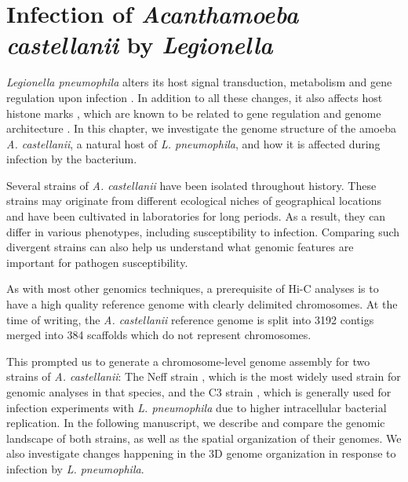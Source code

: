 
\chapter{Infection of \textit{Acanthamoeba castellanii} by \textit{Legionella}} %

\label{ch:02-02} %


\textit{Legionella pneumophila} alters its host signal transduction, metabolism and gene regulation upon infection \cite{escollTargetingHostOrganelles2016,escollLegionellaPneumophilaModulates2017}. In addition to all these changes, it also affects host histone marks \cite{rolandoLegionellaPneumophilaEffector2013}, which are known to be related to gene regulation and genome architecture \cite{bonevOrganizationFunction3D2016}. In this chapter, we investigate the genome structure of the amoeba \textit{A. castellanii}, a natural host of \textit{L. pneumophila}, and how it is affected during infection by the bacterium.

Several strains of \textit{A. castellanii} have been isolated throughout history. These strains may originate from different ecological niches of geographical locations and have been cultivated in laboratories for long periods. As a result, they can differ in various phenotypes, including susceptibility to infection. Comparing such divergent strains can also help us understand what genomic features are important for pathogen susceptibility.

As with most other genomics techniques, a prerequisite of Hi-C analyses is to have a high quality reference genome with clearly delimited chromosomes. At the time of writing, the \textit{A. castellanii} reference genome is split into 3192 contigs merged into 384 scaffolds which do not represent chromosomes.

This prompted us to generate a chromosome-level genome assembly for two strains of \textit{A. castellanii}: The Neff strain \cite{neffPurificationAxenicCultivation1957}, which is the most widely used strain for genomic analyses in that species, and the C3 strain \cite{michelIsolationAcanthamoebaStrain1997}, which is generally used for infection experiments with \textit{L. pneumophila} due to higher intracellular bacterial replication. In the following manuscript, we describe and compare the genomic landscape of both strains, as well as the spatial organization of their genomes. We also investigate changes happening in the 3D genome organization in response to infection by \textit{L. pneumophila}.

